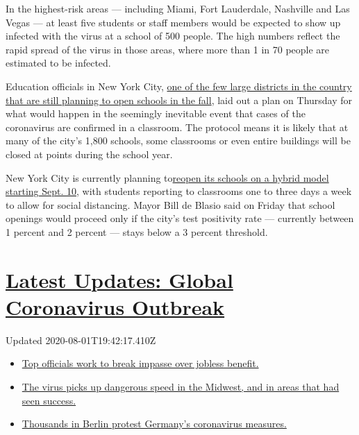In the highest-risk areas --- including Miami, Fort Lauderdale,
Nashville and Las Vegas --- at least five students or staff members
would be expected to show up infected with the virus at a school of 500
people. The high numbers reflect the rapid spread of the virus in those
areas, where more than 1 in 70 people are estimated to be infected.

Education officials in New York City,
\href{https://www.nytimes3xbfgragh.onion/2020/07/14/us/coronavirus-schools-fall.html}{one
of the few large districts in the country that are still planning to
open schools in the fall}, laid out a plan on Thursday for what would
happen in the seemingly inevitable event that cases of the coronavirus
are confirmed in a classroom. The protocol means it is likely that at
many of the city's 1,800 schools, some classrooms or even entire
buildings will be closed at points during the school year.

New York City is currently planning
to\href{https://www.nytimes3xbfgragh.onion/2020/07/08/nyregion/nyc-schools-reopening-plan.html}{reopen
its schools on a hybrid model starting Sept. 10}, with students
reporting to classrooms one to three days a week to allow for social
distancing. Mayor Bill de Blasio said on Friday that school openings
would proceed only if the city's test positivity rate --- currently
between 1 percent and 2 percent --- stays below a 3 percent threshold.

\hypertarget{latest-updates-global-coronavirus-outbreak}{%
\section{\texorpdfstring{\href{https://www.nytimes3xbfgragh.onion/2020/08/01/world/coronavirus-covid-19.html?action=click\&pgtype=Article\&state=default\&region=MAIN_CONTENT_1\&context=storylines_live_updates}{Latest
Updates: Global Coronavirus
Outbreak}}{Latest Updates: Global Coronavirus Outbreak}}\label{latest-updates-global-coronavirus-outbreak}}

Updated 2020-08-01T19:42:17.410Z

\begin{itemize}
\tightlist
\item
  \href{https://www.nytimes3xbfgragh.onion/2020/08/01/world/coronavirus-covid-19.html?action=click\&pgtype=Article\&state=default\&region=MAIN_CONTENT_1\&context=storylines_live_updates\#link-3ac56579}{Top
  officials work to break impasse over jobless benefit.}
\item
  \href{https://www.nytimes3xbfgragh.onion/2020/08/01/world/coronavirus-covid-19.html?action=click\&pgtype=Article\&state=default\&region=MAIN_CONTENT_1\&context=storylines_live_updates\#link-8796723}{The
  virus picks up dangerous speed in the Midwest, and in areas that had
  seen success.}
\item
  \href{https://www.nytimes3xbfgragh.onion/2020/08/01/world/coronavirus-covid-19.html?action=click\&pgtype=Article\&state=default\&region=MAIN_CONTENT_1\&context=storylines_live_updates\#link-25930521}{Thousands
  in Berlin protest Germany's coronavirus measures.}
\end{itemize}

